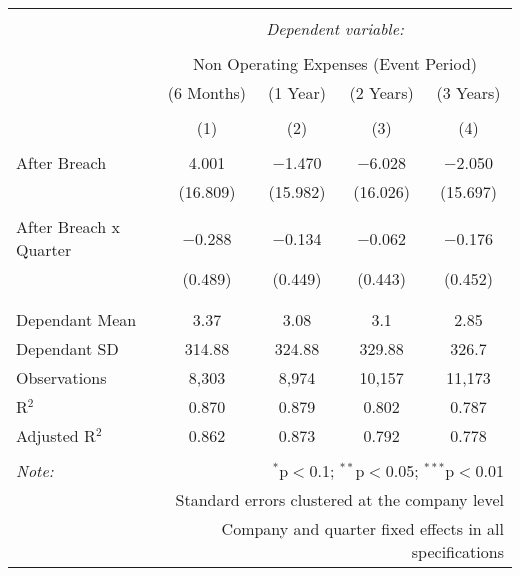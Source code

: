 
\begin{table}[!htbp] \centering 
  \caption{} 
  \label{} 
\begin{tabular}{@{\extracolsep{5pt}}lcccc} 
\\[-1.8ex]\hline 
\hline \\[-1.8ex] 
 & \multicolumn{4}{c}{\textit{Dependent variable:}} \\ 
\cline{2-5} 
\\[-1.8ex] & \multicolumn{4}{c}{Non Operating Expenses (Event Period)} \\ 
 & (6 Months) & (1 Year) & (2 Years) & (3 Years) \\ 
\\[-1.8ex] & (1) & (2) & (3) & (4)\\ 
\hline \\[-1.8ex] 
 After Breach & 4.001 & $-$1.470 & $-$6.028 & $-$2.050 \\ 
  & (16.809) & (15.982) & (16.026) & (15.697) \\ 
  & & & & \\ 
 After Breach x Quarter & $-$0.288 & $-$0.134 & $-$0.062 & $-$0.176 \\ 
  & (0.489) & (0.449) & (0.443) & (0.452) \\ 
  & & & & \\ 
\hline \\[-1.8ex] 
Dependant Mean & 3.37 & 3.08 & 3.1 & 2.85 \\ 
Dependant SD & 314.88 & 324.88 & 329.88 & 326.7 \\ 
Observations & 8,303 & 8,974 & 10,157 & 11,173 \\ 
R$^{2}$ & 0.870 & 0.879 & 0.802 & 0.787 \\ 
Adjusted R$^{2}$ & 0.862 & 0.873 & 0.792 & 0.778 \\ 
\hline 
\hline \\[-1.8ex] 
\textit{Note:}  & \multicolumn{4}{r}{$^{*}$p$<$0.1; $^{**}$p$<$0.05; $^{***}$p$<$0.01} \\ 
 & \multicolumn{4}{r}{Standard errors clustered at the company level} \\ 
 & \multicolumn{4}{r}{Company and quarter fixed effects in all specifications} \\ 
\end{tabular} 
\end{table} 
